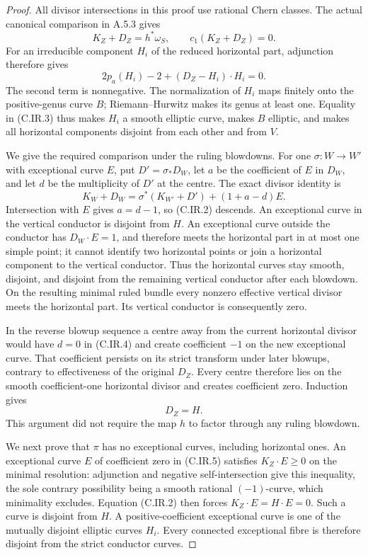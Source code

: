 \begin{proof}
All divisor intersections in this proof use rational Chern
classes. The actual canonical comparison in A.5.3 gives
\[
 K_Z+D_Z=h^*\omega_S,\qquad c_1(K_Z+D_Z)=0.
                                                     \tag{C.IR.2}
\]
For an irreducible component $H_i$ of the reduced horizontal
part, adjunction therefore gives
\[
 2p_a(H_i)-2+(D_Z-H_i)\cdot H_i=0.                 \tag{C.IR.3}
\]
The second term is nonnegative. The normalization of $H_i$
maps finitely onto the positive-genus curve $B$; Riemann--Hurwitz
makes its genus at least one. Equality in (C.IR.3) thus makes
$H_i$ a smooth elliptic curve, makes $B$ elliptic, and makes
all horizontal components disjoint from each other and from
$V$.

We give the required comparison under the ruling blowdowns.
For one $\sigma:W\to W'$ with exceptional curve $E$, put
$D'=\sigma_*D_W$, let $a$ be the coefficient of $E$ in $D_W$,
and let $d$ be the multiplicity of $D'$ at the centre. The
exact divisor identity is
\[
 K_W+D_W=\sigma^*(K_{W'}+D')+(1+a-d)E.
                                                     \tag{C.IR.4}
\]
Intersection with $E$ gives $a=d-1$, so (C.IR.2) descends.
An exceptional curve in the vertical conductor is disjoint
from $H$. An exceptional curve outside the conductor has
$D_W\cdot E=1$, and therefore meets the horizontal part in
at most one simple point; it cannot identify two horizontal
points or join a horizontal component to the vertical
conductor. Thus the horizontal curves stay smooth, disjoint,
and disjoint from the remaining vertical conductor after
each blowdown. On the resulting minimal ruled bundle every
nonzero effective vertical divisor meets the horizontal
part. Its vertical conductor is consequently zero.

In the reverse blowup sequence a centre away from the current
horizontal divisor would have $d=0$ in (C.IR.4) and create
coefficient $-1$ on the new exceptional curve. That coefficient
persists on its strict transform under later blowups, contrary
to effectiveness of the original $D_Z$. Every centre
therefore lies on the smooth coefficient-one horizontal
divisor and creates coefficient zero. Induction gives
\[
                             D_Z=H.               \tag{C.IR.5}
\]
This argument did not require the map $h$ to factor through
any ruling blowdown.

We next prove that $\pi$ has no exceptional curves, including
horizontal ones. An exceptional curve $E$ of coefficient
zero in (C.IR.5) satisfies $K_Z\cdot E\ge0$ on the minimal
resolution: adjunction and negative self-intersection give
this inequality, the sole contrary possibility being a
smooth rational $(-1)$-curve, which minimality excludes.
Equation (C.IR.2) then forces $K_Z\cdot E=H\cdot E=0$.
Such a curve is disjoint from $H$. A positive-coefficient
exceptional curve is one of the mutually disjoint elliptic
curves $H_i$. Every connected exceptional fibre is therefore
disjoint from the strict conductor curves.


\end{proof}
